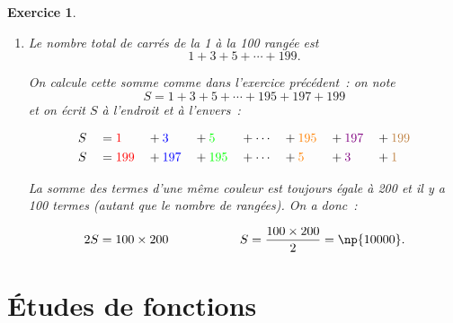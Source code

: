\documentclass[10pt]{article}
\newtheorem{exo}{Exercice}
\begin{document}
\begin{exo}
\begin{enumerate}
\item Le nombre total de carrés de la 1 à la 100 rangée est 
\[1+3+5+\cdots+199.\]

On calcule cette somme comme dans l'exercice précédent~: on note \[S=1+3+5+\cdots+195+197+199\] et on écrit $S$ à l'endroit et à l'envers~:

\begin{alignat*}{8}
&S&&= \textcolor{red}{1}&&+\textcolor{blue}{3}&&+\textcolor{green}{5}&&+\cdots  &&+\textcolor{orange}{195} &&+ \textcolor{violet}{197}&&+ \textcolor{brown}{199}\\
&S&&= \textcolor{red}{199}&&+\textcolor{blue}{197}&&+\textcolor{green}{195}&&+\cdots &&+\textcolor{orange}{5} &&+ \textcolor{violet}{3}&&+ \textcolor{brown}{1}
\end{alignat*}

La somme des termes d'une même couleur est toujours égale à 200 et il y a 100 termes (autant que le nombre de rangées). On a donc~:

\[2S=100\times 200\hspace{2cm} S=\frac{100\times 200}{2}=\np{10000}.\]

\end{enumerate}
\end{exo}


\section{Études de fonctions}
\end{document}
